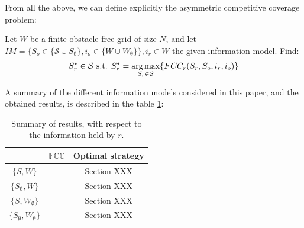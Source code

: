 \documentclass[a4paper,10pt]{article}
\newcommand\rob{\ensuremath{r}\xspace}
\newcommand\opp{\ensuremath{o}\xspace}
\newcommand{\w}{\ensuremath{W}\xspace}
\newcommand{\fcc}{\ensuremath{FCC}\xspace}
\DeclareMathOperator*{\argmax}{arg\,max} %
\begin{document}
From all the above, we can define explicitly the asymmetric competitive coverage problem:

\begin{mdframed}[backgroundcolor=gray!20] 
Let \w be a finite obstacle-free grid of size $N$, and let $IM=\lbrace S_{\opp}\in \lbrace \mathcal{S}\cup S_{\emptyset} \rbrace,i_{\opp}\in \lbrace \w \cup \w_{\emptyset} \rbrace \rbrace,i_{\rob}\in\w$ the given information model. Find: \[ S_{\rob}^\star \in \mathcal{S} \textnormal{ s.t. } S_{\rob}^\star =\argmax_{S_{\rob}\in\mathcal{S}} \lbrace \fcc_{r}(S_{\rob}, S_{\opp}, i_{\rob}, i_{\opp} ) \rbrace\]
\end{mdframed}


A summary of the different information models considered in this paper, and the obtained results, is described in the table \ref{tables:priliminary results}:

%

\begin{table}
\caption{Summary of results, with respect to the information held by \rob.}
\label{tables:priliminary results}
\begin{center}
\begin{tabular}{|c||c|c|}
\hline 
& $\mathbb{\fcc}$ & Optimal strategy\\
\hline
$\lbrace S, \w \rbrace$ &  & Section XXX\\
\hline
$\lbrace S_{\emptyset}, \w \rbrace$ &  & Section XXX\\
\hline
$\lbrace S, \w_{\emptyset} \rbrace$ &  & Section XXX\\
\hline
$\lbrace S_{\emptyset}, \w_{\emptyset} \rbrace$ &  & Section XXX\\
\hline
\end{tabular}
\end{center}
\end{table}
\end{document}
